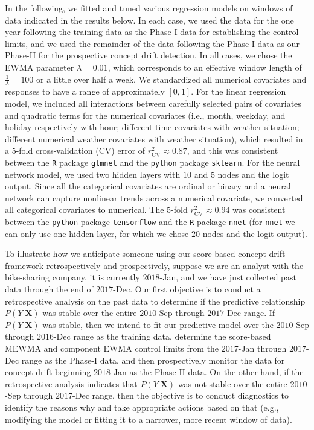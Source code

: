 \documentclass[twoside,11pt]{article}
\begin{document}
In the following, we fitted and tuned various regression models on windows of data indicated in the results below. In each case, we used the data for the one year following the training data as the Phase-I data for establishing the control limits, and we used the remainder of the data following the Phase-I data as our Phase-II for the prospective concept drift detection. In all cases, we chose the EWMA parameter $ \lambda = 0.01$, which corresponds to an effective window length of $\frac{1}{\lambda}=100$ or a little over half a week. We standardized all numerical covariates and responses to have a range of approximately $[0,1]$. For the linear regression model, we included all interactions between carefully selected pairs of covariates and quadratic terms for the numerical covariates (i.e., month, weekday, and holiday respectively with hour; different time covariates with weather situation; different numerical weather covariates with weather situation), %
which resulted in a $5$-fold cross-validation (CV) error of $r^2_{\mathrm{CV}} \approx 0.87$, and this was consistent between the \texttt{R} package \texttt{glmnet} and the \texttt{python} package \texttt{sklearn}. For the neural network model, we used two hidden layers with $10$ and $5$ nodes and the logit output. Since all the categorical covariates are ordinal or binary and a neural network can capture nonlinear trends across a numerical covariate, we converted all categorical covariates to numerical. The $5$-fold $r^2_{\mathrm{CV}} \approx 0.94$ was consistent between the \texttt{python} package \texttt{tensorflow} and the \texttt{R} package \texttt{nnet} (for \texttt{nnet} we can only use one hidden layer, for which we chose $20$ nodes and the logit output). %

To illustrate how we anticipate someone using our score-based concept drift framework retrospectively and prospectively, suppose we are an analyst with the bike-sharing company, it is currently $2018$-Jan, and we have just collected past data through the end of $2017$-Dec. Our first objective is to conduct a retrospective analysis on the past data to determine if the predictive relationship $P(Y|\bm{X})$ was stable over the entire $2010$-Sep through $2017$-Dec range. If $P(Y|\bm{X})$ was stable, then we intend to fit our predictive model over the $2010$-Sep through $2016$-Dec range as the training data, determine the score-based MEWMA and component EWMA control limits from the $2017$-Jan through $2017$-Dec range as the Phase-I data, and then prospectively monitor the data for concept drift beginning $2018$-Jan as the Phase-II data. On the other hand, if the retrospective analysis indicates that $P(Y|\bm{X})$ was not stable over the entire $2010$-Sep through $2017$-Dec range, then the objective is to conduct diagnostics to identify the reasons why and take appropriate actions based on that (e.g., modifying the model or fitting it to a narrower, more recent window of data).
\end{document}
